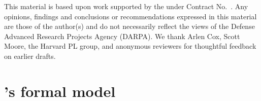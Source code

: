 \documentclass[acmsmall,screen,nonacm]{acmart}
\theoremstyle{definition}
\begin{document}
\begin{acks}                            %
  This material is based upon work supported by the  under
  Contract No.~.  Any opinions, findings and
  conclusions or recommendations expressed in this material are those of the
  author(s) and do not necessarily reflect the views of the Defense Advanced
  Research Projects Agency (DARPA).
  We thank Arlen Cox, Scott Moore, the Harvard PL group, and anonymous
  reviewers for thoughtful feedback on earlier drafts.

\end{acks}





\iffull
\clearpage
\onecolumn
\appendix

\section{\Name's formal model}
\end{document}
